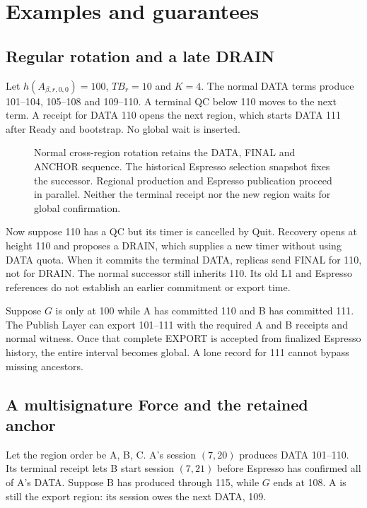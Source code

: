 \documentclass[11pt,a4paper]{article}
\newcommand{\TB}{\mathit{TB}}
\begin{document}
\section{Examples and guarantees}
\label{sec:examples}
\subsection{Regular rotation and a late DRAIN}
\label{sec:regular-example}
Let $h(A_{\beta,r,0,0})=100$, $\TB_r=10$ and $K=4$. The normal DATA terms
produce 101--104, 105--108 and 109--110. A terminal QC below 110 moves
to the next term. A receipt for DATA 110 opens the next region, which
starts DATA 111 after Ready and bootstrap. No global wait is inserted.

\begin{figure}[htbp]\centering

\caption{Normal cross-region rotation retains the DATA, FINAL and
ANCHOR sequence. The historical Espresso selection snapshot fixes the
successor. Regional production and Espresso publication proceed in
parallel. Neither the terminal receipt nor the new region waits for
global confirmation.}
\label{fig:regular-cross-region}
\end{figure}
\FloatBarrier

Now suppose 110 has a QC but its timer is cancelled by Quit.
Recovery opens at height 110 and proposes a DRAIN, which supplies a
new timer without using DATA quota. When it commits the terminal DATA,
replicas send FINAL for 110, not for DRAIN. The normal successor still
inherits 110. Its old L1 and Espresso references do not establish an
earlier commitment or export time.

Suppose $G$ is only at 100 while A has committed 110 and B has committed
111. The Publish Layer can export 101--111 with the required A and B receipts
and normal witness. Once that complete EXPORT is accepted from finalized
Espresso history, the entire interval becomes global. A lone record for
111 cannot bypass missing ancestors.

\subsection{A multisignature Force and the retained anchor}
\label{sec:force-example}
Let the region order be A, B, C. A's session $(7,20)$ produces
DATA 101--110. Its terminal receipt lets B start session $(7,21)$
before Espresso has confirmed all of A's DATA. Suppose B has produced
through 115, while $G$ ends at 108. A is still the export region:
its session owes the next DATA, 109.
\end{document}
